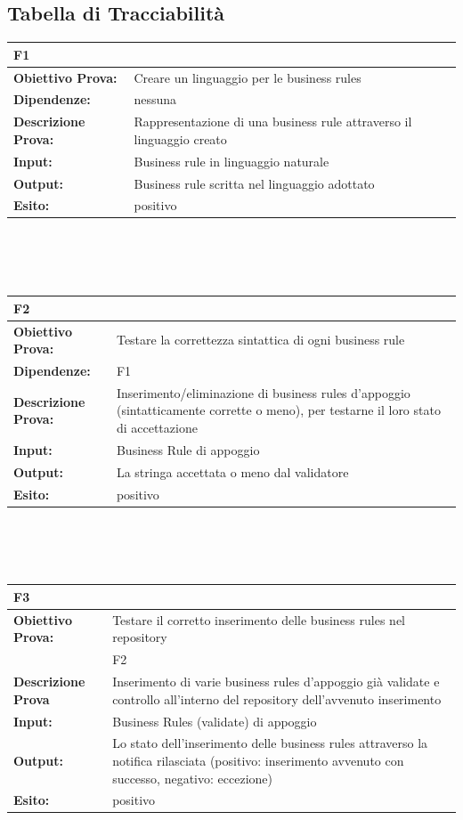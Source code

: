 \documentclass[11pt,titlepage,a4paper]{report}
\begin{document}
\subsection{Tabella di Tracciabilit\`a}
\begin{tabular}{||p{4.5cm}||p{7.5cm}||}
\hline
\textbf{\textsf{F1}}& \\
\hline
{\textbf {Obiettivo Prova:}}& Creare un linguaggio per le business rules \\ \hline
{\textbf{Dipendenze:}}& nessuna \\ \hline
{\textbf{Descrizione Prova:}}& Rappresentazione di una business rule attraverso il linguaggio creato \\ \hline
{\textbf{Input:}}&  Business rule in linguaggio naturale \\ \hline
{\textbf{Output:}}& Business rule scritta nel linguaggio adottato \\ \hline
{\textbf{Esito:}}&  positivo\\ \hline
\end{tabular} \\
\\
\\
\begin{tabular}{||p{4.5cm}||p{7.5cm}||}
\hline
\textbf{\textsf{F2}}& \\
\hline
{\textbf {Obiettivo Prova:}}& Testare la correttezza sintattica di ogni business rule \\ \hline
{\textbf{Dipendenze:}}& F1 \\ \hline
{\textbf{Descrizione Prova:}}& Inserimento/eliminazione di business rules d'appoggio (sintatticamente corrette o meno), per testarne il loro stato di accettazione \\ \hline
{\textbf{Input:}}& Business Rule di appoggio \\ \hline
{\textbf{Output:}}& La stringa accettata o meno dal validatore \\ \hline
{\textbf{Esito:}}&  positivo\\ \hline
\end{tabular} \\
\\
\\
\begin{tabular}{||p{4.5cm}||p{7.5cm}||}
\hline
\textbf{\textsf{F3}}& \\
\hline
{\textbf {Obiettivo Prova:}}& Testare il corretto inserimento delle business rules nel repository\\ \hline
{\textbf{Dipendenze:}& F2 \\ \hline
{\textbf{Descrizione Prova}}&  Inserimento di varie business rules d'appoggio gi\`a validate e controllo all'interno del repository dell'avvenuto inserimento\\ \hline
{\textbf{Input:}}& Business Rules (validate) di appoggio \\ \hline
{\textbf{Output:}}& Lo stato dell'inserimento delle business rules attraverso la notifica rilasciata (positivo: inserimento avvenuto con successo, negativo: eccezione) \\ \hline
{\textbf{Esito:}}&  positivo\\ \hline
\end{tabular} \\
\end{document}
